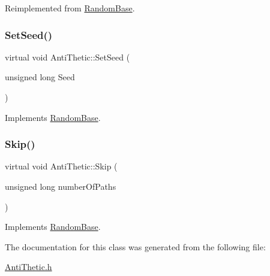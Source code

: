 Reimplemented from \hyperlink{classRandomBase_a8931e429ae130ea44af5469dc6ae728f}{Random\+Base}.

\hypertarget{classAntiThetic_a0561b133af3db59319d7ede6a52fb1d4}{}\label{classAntiThetic_a0561b133af3db59319d7ede6a52fb1d4} 
\subsubsection{\texorpdfstring{Set\+Seed()}{SetSeed()}}
{\footnotesize\ttfamily virtual void Anti\+Thetic\+::\+Set\+Seed (\begin{DoxyParamCaption}\item[{unsigned long}]{Seed }\end{DoxyParamCaption})\hspace{0.3cm}{\ttfamily [virtual]}}



Implements \hyperlink{classRandomBase_ae93f26c38d1675ef07cb1fd29b894b26}{Random\+Base}.

\hypertarget{classAntiThetic_ab401f6a7ce58643b3f147886d837e097}{}\label{classAntiThetic_ab401f6a7ce58643b3f147886d837e097} 
\subsubsection{\texorpdfstring{Skip()}{Skip()}}
{\footnotesize\ttfamily virtual void Anti\+Thetic\+::\+Skip (\begin{DoxyParamCaption}\item[{unsigned long}]{number\+Of\+Paths }\end{DoxyParamCaption})\hspace{0.3cm}{\ttfamily [virtual]}}



Implements \hyperlink{classRandomBase_a0531f44e3e2a71d14ef1490aa5d90b77}{Random\+Base}.



The documentation for this class was generated from the following file\+:\begin{DoxyCompactItemize}
\item 
\hyperlink{AntiThetic_8h}{Anti\+Thetic.\+h}\end{DoxyCompactItemize}

